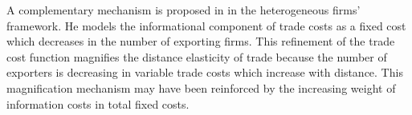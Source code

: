 \documentclass[12pt,twoside,a4paper,notitlepage]{article}
\begin{document}
A complementary mechanism is proposed in \cite{Krautheim2012} in the heterogeneous firms' framework.
He models the informational component of trade costs as a fixed cost which decreases in the number of exporting firms.
This refinement of the trade cost function magnifies the distance elasticity of trade because the number of exporters is decreasing in variable trade costs which increase with distance.
This magnification mechanism may have been reinforced by the increasing weight of information costs in total fixed costs.
\end{document}

